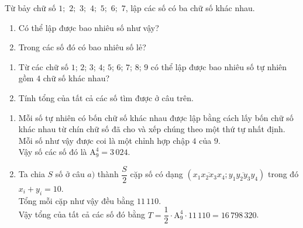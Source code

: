 \begin{vd}
	Từ bảy chữ số $1 ;$ $2 ;$ $ 3 ;$ $ 4 ;$ $ 5 ;$ $ 6 ;$ $ 7$, lập các số có ba chữ số khác nhau.
	\begin{enumerate}
		\item Có thể lập được bao nhiêu số như vậy?
		\item Trong các số đó có bao nhiêu số lẻ?
	\end{enumerate}
\end{vd}
\begin{vd}
	\begin{enumerate}
		\item Từ các chữ số $1$; $2$; $3$; $4$; $5$; $6$; $7$; $8$; $9$ có thể lập được bao nhiêu số tự nhiên gồm $4$ chữ số khác nhau?
		\item Tính tổng của tất cả các số tìm được ở câu trên.
	\end{enumerate}
	\loigiai
	{
		\begin{enumerate}
			\item Mỗi số tự nhiên có bốn chữ số khác nhau được lập bằng cách lấy bốn chữ số khác nhau từ chín chữ số đã cho và xếp chúng theo một thứ tự nhất định.\\
			Mỗi số như vậy được coi là một chỉnh hợp chập $4$ của $9$.\\
			Vậy số các số đó là $\mathrm{A}_9^4=3\, 024$.
			\item Ta chia $S$ số ở câu $a)$ thành $\dfrac{S}{2}$ cặp số có dạng $(\overline{x_1x_2x_3 x_4};\overline{y_1 y_2 y_3 y_4})$ trong đó $x_i+y_i=10$.\\
			Tổng mỗi cặp như vậy đều bằng $11\, 110$.\\
			Vậy tổng của tất cả các số đó bằng $T=\dfrac{1}{2}\cdot \mathrm{A}_9^4\cdot 11\, 110=16\, 798\, 320$.
		\end{enumerate}
	}
\end{vd}
